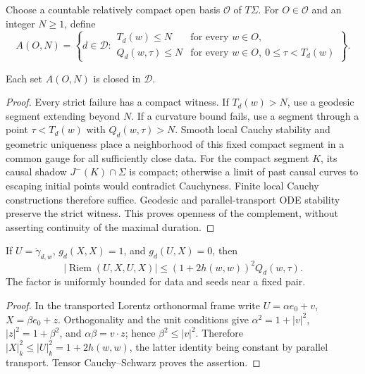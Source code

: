 Choose a countable relatively compact open basis \(\mathscr O\) of
\(T\Sigma\). For \(O\in\mathscr O\) and an integer \(N\geq1\), define
\begin{equation}\label{cat:test}
 A(O,N)=\left\{d\in\mathcal D:
 \begin{array}{ll}
 T_d(w)\leq N &\text{for every }w\in O,\\
 Q_d(w,\tau)\leq N &\text{for every }w\in O,
                    \ 0\leq\tau<T_d(w)
 \end{array}\right\}.
\end{equation}

\begin{lemma}\label{cat:closed-tests}
Each set \(A(O,N)\) is closed in \(\mathcal D\).
\end{lemma}
\begin{proof}
Every strict failure has a compact witness. If \(T_d(w)>N\), use a
geodesic segment extending beyond \(N\). If a curvature bound fails,
use a segment through a point \(\tau<T_d(w)\) with
\(Q_d(w,\tau)>N\). Smooth local Cauchy stability and geometric
uniqueness place a neighborhood of this fixed compact segment in a
common gauge for all sufficiently close data. For the compact segment
\(K\), its causal shadow \(J^-(K)\cap\Sigma\) is compact; otherwise a limit of
past causal curves to escaping initial points would contradict
Cauchyness. Finite local Cauchy constructions therefore suffice.
Geodesic and parallel-transport ODE stability preserve the strict
witness. This proves openness of the complement, without asserting
continuity of the maximal duration.
\end{proof}

\begin{lemma}\label{cat:tidal}
If \(U=\dot\gamma_{d,w}\), \(g_d(X,X)=1\), and \(g_d(U,X)=0\), then
\begin{equation}\label{cat:tidal-bound}
 |\operatorname{Riem}(U,X,U,X)|
 \leq (1+2h(w,w))^2 Q_d(w,\tau).
\end{equation}
The factor is uniformly bounded for data and seeds near a fixed pair.
\end{lemma}
\begin{proof}
In the transported Lorentz orthonormal frame write
\(U=\alpha e_0+v\), \(X=\beta e_0+z\). Orthogonality and the unit
conditions give \(\alpha^2=1+|v|^2\), \(|z|^2=1+\beta^2\), and
\(\alpha\beta=v\cdot z\); hence \(\beta^2\leq|v|^2\).
Therefore \(|X|_k^2\leq|U|_k^2=1+2h(w,w)\), the latter identity
being constant by parallel transport. Tensor Cauchy--Schwarz proves
the assertion.
\end{proof}

